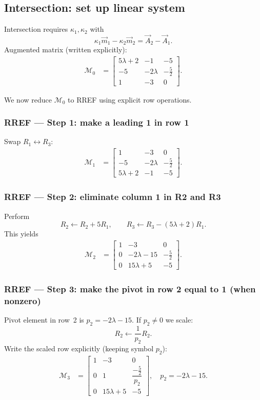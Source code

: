 \documentclass[journal]{IEEEtran}
\begin{document}
\subsection*{Intersection: set up linear system}
Intersection requires \(\kappa_1,\kappa_2\) with
\[
\kappa_1\vec{m}_1 - \kappa_2\vec{m}_2 = \vec{A}_2-\vec{A}_1.
\]
Augmented matrix (written explicitly):
\begin{align}
\mathcal{M}_0 &= 
\left[\begin{array}{cc|c}
5\lambda+2 & -1 & -5 \\
-5 & -2\lambda & -\tfrac{5}{2} \\
1 & -3 & 0
\end{array}\right]. \label{M0}
\end{align}

We now reduce \(\mathcal{M}_0\) to RREF using explicit row operations.

\subsubsection*{RREF — Step 1: make a leading 1 in row 1}
Swap \(R_1\leftrightarrow R_3\):
\begin{align}
\mathcal{M}_1 &=
\left[\begin{array}{cc|c}
1 & -3 & 0 \\
-5 & -2\lambda & -\tfrac{5}{2} \\
5\lambda+2 & -1 & -5
\end{array}\right].
\end{align}

\subsubsection*{RREF — Step 2: eliminate column 1 in R2 and R3}
Perform
\[
R_2 \leftarrow R_2 + 5R_1,\qquad R_3 \leftarrow R_3 - (5\lambda+2)R_1.
\]
This yields
\begin{align}
\mathcal{M}_2 &=
\left[\begin{array}{cc|c}
1 & -3 & 0 \\
0 & -2\lambda-15 & -\tfrac{5}{2} \\
0 & 15\lambda+5 & -5
\end{array}\right]. \label{M2}
\end{align}

\subsubsection*{RREF — Step 3: make the pivot in row 2 equal to 1 (when nonzero)}
Pivot element in row~2 is \(p_2 = -2\lambda-15\). If \(p_2\neq 0\) we scale:
\[
R_2 \leftarrow \frac{1}{p_2} R_2.
\]
Write the scaled row explicitly (keeping symbol \(p_2\)):
\begin{align}
\mathcal{M}_3 &=
\left[\begin{array}{cc|c}
1 & -3 & 0 \\
0 & 1 & \dfrac{-\tfrac{5}{2}}{p_2} \\
0 & 15\lambda+5 & -5
\end{array}\right], \quad p_2=-2\lambda-15.
\end{align}
\end{document}
